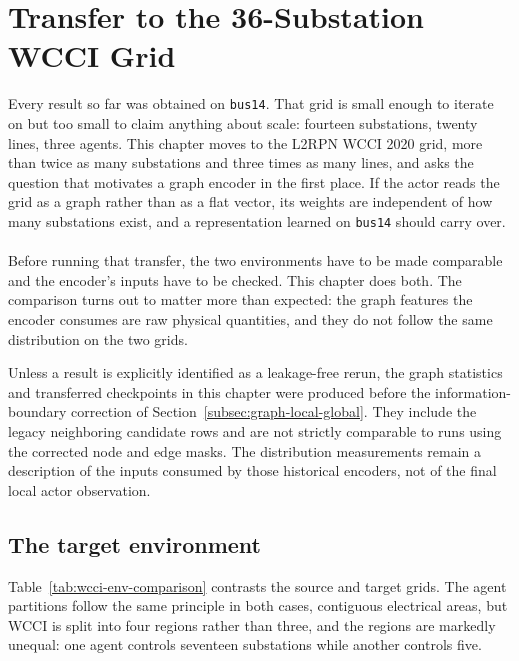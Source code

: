 \chapter{Transfer to the 36-Substation WCCI Grid}
\label{ch:wcci-transfer}

Every result so far was obtained on \texttt{bus14}. That grid is small enough to
iterate on but too small to claim anything about scale: fourteen substations,
twenty lines, three agents. This chapter moves to the L2RPN WCCI 2020 grid, more
than twice as many substations and three times as many lines, and asks the
question that motivates a graph encoder in the first place. If the actor reads
the grid as a graph rather than as a flat vector, its weights are independent of
how many substations exist, and a representation learned on \texttt{bus14}
should carry over.
\\
\\
Before running that transfer, the two environments have to be made comparable
and the encoder's inputs have to be checked. This chapter does both. The
comparison turns out to matter more than expected: the graph features the
encoder consumes are raw physical quantities, and they do not follow the same
distribution on the two grids.

\begin{tcolorbox}[
  colframe=darkred,
  colback=red!4!white,
  title=Legacy graph-observation qualifier
]
Unless a result is explicitly identified as a leakage-free rerun, the graph
statistics and transferred checkpoints in this chapter were produced before
the information-boundary correction of
Section~\ref{subsec:graph-local-global}. They include the legacy neighboring
candidate rows and are not strictly comparable to runs using the corrected
node and edge masks. The distribution measurements remain a description of
the inputs consumed by those historical encoders, not of the final local actor
observation.
\end{tcolorbox}


\section{The target environment}
\label{sec:wcci-environment}

Table~\ref{tab:wcci-env-comparison} contrasts the source and target grids. The
agent partitions follow the same principle in both cases, contiguous electrical
areas, but WCCI is split into four regions rather than three, and the regions
are markedly unequal: one agent controls seventeen substations while another
controls five.

